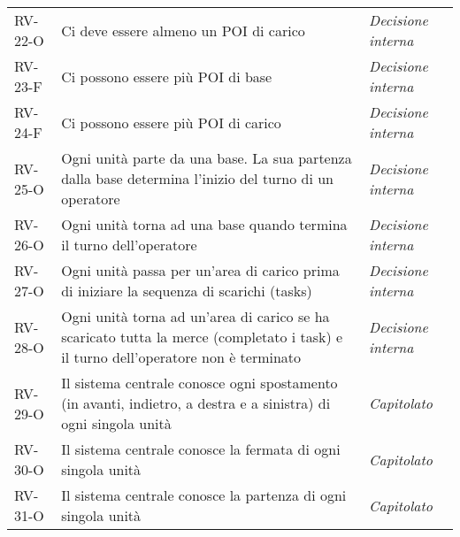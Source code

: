 \begin{longtable}{ 
		>{\centering}p{} 
		>{}p{}
		>{\centering \it}p{} }
RV-22-O & Ci deve essere almeno un POI di carico & Decisione interna\tabularnewline
RV-23-F & Ci possono essere più POI di base & Decisione interna\tabularnewline
RV-24-F & Ci possono essere più POI di carico & Decisione interna\tabularnewline
RV-25-O & Ogni unità parte da una base. La sua partenza dalla base determina l'inizio del turno di un operatore & Decisione interna\tabularnewline
RV-26-O & Ogni unità torna ad una base quando termina il turno dell’operatore & Decisione interna\tabularnewline
RV-27-O & Ogni unità passa per un’area di carico prima di iniziare la sequenza di scarichi (tasks) & Decisione interna\tabularnewline
RV-28-O & Ogni unità torna ad un'area di carico se ha scaricato tutta la merce (completato i task) e il turno dell’operatore non è terminato & Decisione interna\tabularnewline
RV-29-O & Il sistema centrale conosce ogni spostamento (in avanti, indietro, a destra e a sinistra) di ogni singola unità & Capitolato\tabularnewline
RV-30-O & Il sistema centrale conosce la fermata di ogni singola unità & Capitolato\tabularnewline
RV-31-O & Il sistema centrale conosce la partenza di ogni singola unità & Capitolato\tabularnewline
\end{longtable}